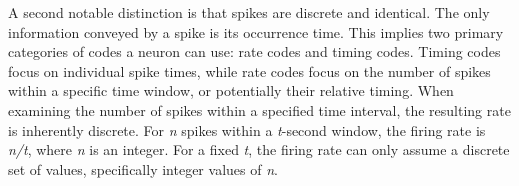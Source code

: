 


\noindent A second notable distinction is that spikes are discrete and identical. The only information conveyed by a spike is its occurrence time. This implies two primary categories of codes a neuron can use: rate codes and timing codes. Timing codes focus on individual spike times, while rate codes focus on the number of spikes within a specific time window, or potentially their relative timing. When examining the number of spikes within a specified time interval, the resulting rate is inherently discrete. For \textit{n} spikes within a \textit{t}-second window, the firing rate is \textit{n/t}, where \textit{n} is an integer. For a fixed \textit{t}, the firing rate can only assume a discrete set of values, specifically integer values of \textit{n}. \\



